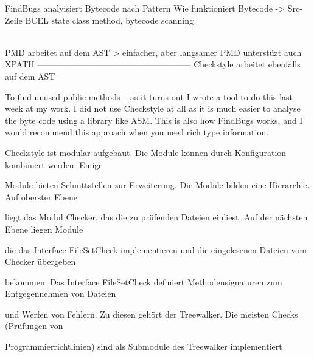 FindBugs analyisiert Bytecode nach Pattern
Wie funktioniert Bytecode -> Src-Zeile
BCEL
state class method, bytecode scanning
------------------------------------------------------

PMD arbeitet auf dem AST > einfacher, aber langsamer
PMD unterstüzt auch XPATH
------------------------------------------------------
Checkstyle arbeitet ebenfalls auf dem AST


To find unused public methods -- as it turns out I wrote a tool to do this last week at my work. I did not use Checkstyle at all as it is much easier to analyse the byte code using a library like ASM. This is also how FindBugs works, and I would recommend this approach when you need rich type information. 


Checkstyle ist modular aufgebaut. Die Module können durch Konfiguration kombiniert werden. Einige 

Module bieten Schnittstellen zur Erweiterung. Die Module bilden eine Hierarchie. Auf oberster Ebene 

liegt das Modul Checker, das die zu prüfenden Dateien einliest. Auf der nächsten Ebene liegen Module 

die das Interface FileSetCheck implementieren und die eingelesenen Dateien vom Checker übergeben 

bekommen. Das Interface FileSetCheck definiert Methodensignaturen zum Entgegennehmen von Dateien 

und Werfen von Fehlern. Zu diesen gehört der Treewalker. Die meisten Checks (Prüfungen von 

Programmierrichtlinien) sind als Submodule des Treewalker implementiert



